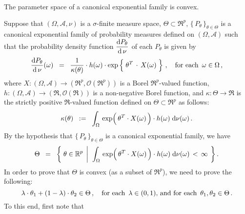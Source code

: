 \begin{theorem}\quad
The parameter space of a {\color{red}canonical} exponential family is convex.
\end{theorem}
\proof
Suppose that $(\Omega,\mathcal{A},\nu)$ is a $\sigma$-finite measure space,
$\Theta \subset \Re^{p}$, $\{\,P_{\theta}\,\}_{\theta\in\Theta}$ is a canonical exponential family 
of probability measures defined on $(\Omega,\mathcal{A})$ such that the probability
density function $\dfrac{\textnormal{d} P_{\theta}}{\textnormal{d}\,\nu}$ of each $P_{\theta}$ is given by
\begin{equation*}
	\dfrac{\d P_{\theta}}{\d\,\nu}(\omega)
	\;\; = \;\;
		\dfrac{1}{\kappa(\theta)}
		\cdot
		h(\omega)
		\cdot
		\exp\left\{\; \theta^{T} \overset{{\color{white}-}}{\cdot} X(\omega) \;\right\}
		\,,
		\quad
		\textnormal{for each \,$\omega\in\Omega$}\,,
\end{equation*}
where
$X : (\Omega,\mathcal{A}) \longrightarrow (\Re^{p},\mathcal{O}(\Re^{p}))$
is a Borel $\Re^{p}$-valued function,
$h : (\Omega,\mathcal{A}) \longrightarrow (\Re,\mathcal{O}(\Re))$
is a non-negative Borel function, and
$\kappa : \Theta \longrightarrow \Re$ is the strictly positive
$\Re$-valued function defined on $\Theta \subset \Re^{p}$ as follows:
\begin{equation*}
\kappa(\theta)
\;\; := \;\;
	\int_{\Omega}\,
		\exp\!\left(\,\theta^{T} \!\overset{{\color{white}-}}{\cdot}\! X(\omega)\,\right) \cdot h(\omega)
	\;\d\nu(\omega)\,.
\end{equation*}
By the hypothesis that $\{\,P_{\theta}\,\}_{\theta\in\Theta}$ is a canonical exponential family, we have
\begin{equation*}
\Theta
\;\; = \;\;
	\left\{\;
		\theta \in \Re^{p}
		\;\left\vert\;\;
		\int_{\Omega}\,
			\exp\!\left(\,\theta^{T} \!\overset{{\color{white}-}}{\cdot}\! X(\omega)\,\right) \cdot h(\omega)
		\;\d\nu(\omega)
		\, < \, \infty
		\right.
	\;\right\}.
\end{equation*}
In order to prove that $\Theta$ is convex (as a subset of $\Re^{p}$),
we need to prove the following:
\begin{equation*}
\lambda \cdot \theta_{1} + (1 - \lambda) \cdot \theta_{2} \in \Theta\,,
\quad
\textnormal{for each \,$\lambda \in (0,1)$, and for each \,$\theta_{1}, \theta_{2} \in \Theta$}\,.
\end{equation*}
To this end, first note that
